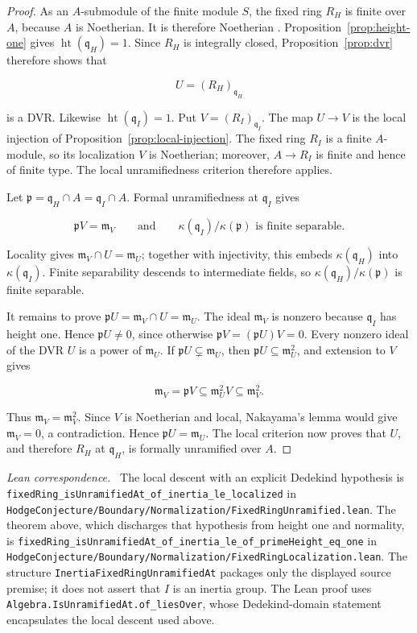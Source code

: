 \documentclass[11pt]{article}
\theoremstyle{remark}
\DeclareMathOperator{\htop}{ht}
\newcommand{\kq}[1]{\kappa(#1)}
\newcommand{\m}{\mathfrak m}
\newcommand{\p}{\mathfrak p}
\newcommand{\q}{\mathfrak q}
\newcommand{\leanpath}[1]{\texttt{\nolinkurl{#1}}}
\newcommand{\leansrc}[1]{%
  \leanpath{HodgeConjecture/Boundary/Normalization/#1}}
\newenvironment{leanfiles}
  {\par\medskip\begingroup\footnotesize\raggedright\noindent
   \textit{Lean correspondence.}\ }
  {\par\endgroup\medskip}
\begin{document}
\begin{proof}
As an \(A\)-submodule of the finite module \(S\), the fixed ring \(R_H\)
is finite over \(A\), because \(A\) is Noetherian.  It is therefore
Noetherian
\cite{StacksNoetherianSubmodules,StacksNoetherianLocalization}.
Proposition~\ref{prop:height-one} gives
\(\htop(\q_H)=1\).  Since \(R_H\) is integrally closed,
Proposition~\ref{prop:dvr} therefore shows that

\[
  U=(R_H)_{\q_H}
\]

is a DVR\@.  Likewise \(\htop(\q_I)=1\).  Put
\(V=(R_I)_{\q_I}\).  The map \(U\to V\) is the local injection of
Proposition~\ref{prop:local-injection}.  The fixed ring \(R_I\) is a finite
\(A\)-module, so its localization \(V\) is Noetherian; moreover, \(A\to R_I\) is
finite and hence of finite type.  The local unramifiedness criterion
therefore applies.

Let \(\p=\q_H\cap A=\q_I\cap A\).  Formal unramifiedness at \(\q_I\) gives

\[
  \p V=\m_V
  \qquad\text{and}\qquad
  \kq{\q_I}/\kq{\p}\text{ is finite separable}.
\]

Locality gives \(\m_V\cap U=\m_U\); together with injectivity, this embeds
\(\kq{\q_H}\) into \(\kq{\q_I}\).  Finite separability descends to
intermediate fields, so
\(\kq{\q_H}/\kq{\p}\) is finite separable.

It remains to prove \(\p U=\m_V\cap U=\m_U\).  The ideal \(\m_V\) is nonzero
because \(\q_I\) has height one.  Hence \(\p U\neq0\), since otherwise
\(\p V=(\p U)V=0\).  Every nonzero ideal of the DVR \(U\) is a power of
\(\m_U\).  If \(\p U\subsetneq\m_U\), then
\(\p U\subseteq\m_U^2\), and extension to \(V\) gives

\[
  \m_V=\p V\subseteq\m_U^2V\subseteq\m_V^2.
\]

Thus \(\m_V=\m_V^2\).  Since \(V\) is Noetherian and local, Nakayama's
lemma would give \(\m_V=0\), a contradiction.  Hence
\(\p U=\m_U\).  The local criterion now proves that \(U\), and therefore
\(R_H\) at \(\q_H\), is formally unramified over \(A\).
\end{proof}

\begin{leanfiles}
The local descent with an explicit Dedekind hypothesis is
\leanpath{fixedRing_isUnramifiedAt_of_inertia_le_localized} in
\leansrc{FixedRingUnramified.lean}.  The theorem above, which discharges
that hypothesis from height one and normality, is
\leanpath{fixedRing_isUnramifiedAt_of_inertia_le_of_primeHeight_eq_one} in
\leansrc{FixedRingLocalization.lean}.  The structure
\leanpath{InertiaFixedRingUnramifiedAt} packages only the displayed source
premise; it does not assert that \(I\) is an inertia group.  The Lean proof
uses \leanpath{Algebra.IsUnramifiedAt.of_liesOver}, whose Dedekind-domain
statement encapsulates the local descent used above.
\end{leanfiles}
\end{document}
